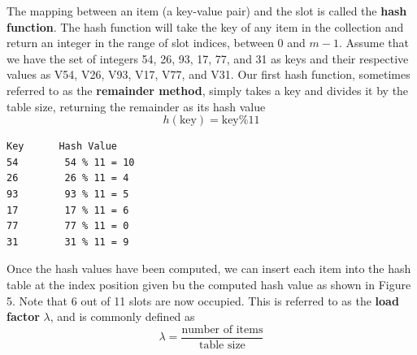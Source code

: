 \documentclass[a4paper,11pt]{book}
\begin{document}
\begin{center}
\end{center}

\noindent The mapping between an item (a key-value pair) and the slot is called the \textbf{hash function}. The hash function will take the key of any item in the collection and return an integer in the range of slot indices, between 0 and $m-1$. Assume that we have the set of integers 54, 26, 93, 17, 77, and 31 as keys and their respective values as V54, V26, V93, V17, V77, and V31. Our first hash function, sometimes referred to as the \textbf{remainder method}, simply takes a key and divides it by the table size, returning the remainder as its hash value $$h(\text{key})=\text{key} \% 11$$
\begin{lstlisting}
Key      Hash Value
54        54 % 11 = 10
26        26 % 11 = 4
93        93 % 11 = 5
17        17 % 11 = 6
77        77 % 11 = 0
31        31 % 11 = 9
\end{lstlisting}

\noindent Once the hash values have been computed, we can insert each item into the hash table at the index position given bu the computed hash value as shown in Figure 5. Note that 6 out of 11 slots are now occupied. This is referred to as the \textbf{load factor} $\lambda$, and is commonly defined as $$\lambda=\dfrac{\text{number of items}}{\text{table size}}$$

\begin{center}
\end{center}
\end{document}
